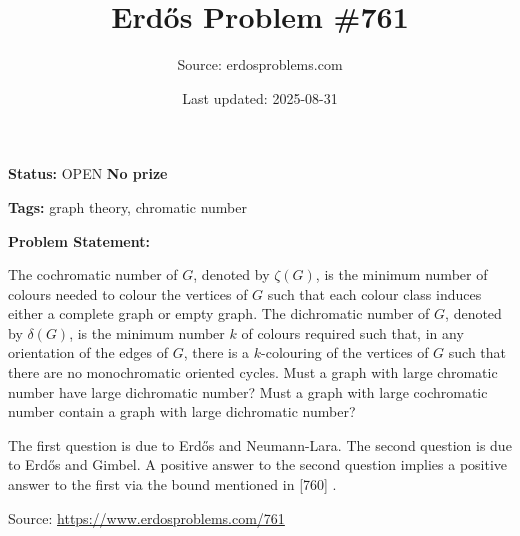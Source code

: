 \documentclass{article}
\title{Erd\H{o}s Problem \#761}
\date{Last updated: 2025-08-31}
\author{Source: erdosproblems.com}
\begin{document}
\maketitle

\noindent\textbf{Status:} OPEN \quad \textbf{No prize}

\noindent\textbf{Tags:} graph theory, chromatic number

\medskip

\noindent\textbf{Problem Statement:}

The cochromatic number of $G$, denoted by $\zeta(G)$, is the minimum number of colours needed to colour the vertices of $G$ such that each colour class induces either a complete graph or empty graph. The dichromatic number of $G$, denoted by $\delta(G)$, is the minimum number $k$ of colours required such that, in any orientation of the edges of $G$, there is a $k$-colouring of the vertices of $G$ such that there are no monochromatic oriented cycles. Must a graph with large chromatic number have large dichromatic number? Must a graph with large cochromatic number contain a graph with large dichromatic number?




The first question is due to Erd\H{o}s and Neumann-Lara. The second question is due to Erd\H{o}s and Gimbel. A positive answer to the second question implies a positive answer to the first via the bound mentioned in [760] .


\bigskip
\noindent\small{Source: \url{https://www.erdosproblems.com/761}}
\end{document}
